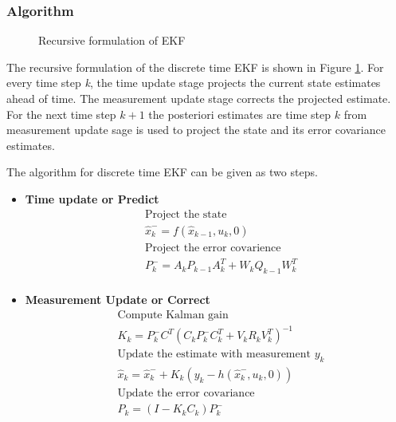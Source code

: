 \subsubsection{Algorithm}
\begin{figure}  

\caption{Recursive formulation of EKF}
\label{fig:ekf_blk}
\end{figure}

    The recursive formulation of the discrete time EKF is shown in Figure \ref{fig:ekf_blk}.  For every time step \emph{k}, the time update stage projects the current state estimates ahead of time. The measurement update stage corrects the projected estimate. For the next time step $k+1$ the posteriori estimates are time step $k$ from measurement update sage is used to project the state and its error covariance estimates.

The algorithm for discrete time EKF can be given as two steps.

\begin{itemize}
    \item \textbf{Time update or Predict}
\begin{equation}
\label{eq:ekf_predict}
\begin{aligned}
&\text{Project the state}\\
&\hat{x}_k^- = f(\hat{x}_{k-1},u_k,0)\\
&\text{Project the error covarience}\\
&P_k^- = A_kP_{k-1}A_k^T + W_kQ_{k-1}W_k^T\\
\end{aligned}
\end{equation}
\item \textbf{Measurement Update or Correct}\\
\begin{equation}
\label{eq:ekf_correct}
\begin{split}
&\text{Compute Kalman gain}\\
&K_k = P_k^-C^T(C_kP_k^-C_k^T + V_kR_kV_k^T)^{-1}\\
&\text{Update the estimate with measurement }y_k\\
&\hat{x}_k = \hat{x}_k^- + K_k(y_k-h(\hat{x}_k^-,u_k,0))\\
&\text{Update the error covariance} \\
&P_k = (I- K_kC_k)P_k^-
\end{split}
\end{equation}
\end{itemize}

